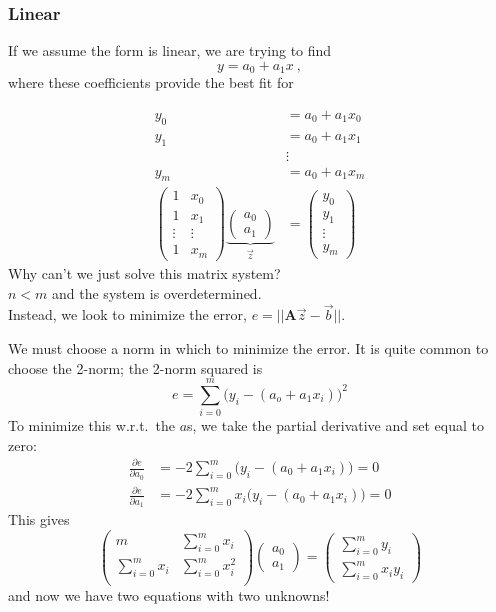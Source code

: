 \documentclass[12pt]{article}
\newcommand{\ve}[1]{\ensuremath{\mathbf{#1}}}
\begin{document}
\subsubsection*{Linear}
If we assume the form is linear, we are trying to find
\[y = a_0 + a_1 x \:,\]
where these coefficients provide the best fit for
 
\begin{align}
y_0 &= a_0 + a_1 x_0 \nonumber \\
y_1 &= a_0 + a_1 x_1 \nonumber\\
& \vdots \nonumber\\
y_m &= a_0 + a_1 x_m \nonumber\\
%
\begin{pmatrix}
1 & x_0 \\ 1 & x_1 \\ \vdots & \vdots \\ 1 & x_m
\end{pmatrix}
\underbrace{\begin{pmatrix}
a_0 \\ a_1
\end{pmatrix}}_{\vec{z}} &=
\begin{pmatrix}
y_0 \\ y_1 \\ \vdots \\ y_m
\end{pmatrix}\nonumber
\end{align}
%
Why can't we just solve this matrix system?\\ $n < m$ and the system is overdetermined.\\ Instead, we look to minimize the error, $e = ||\ve{A}\vec{z} - \vec{b}||$.

We must choose a norm in which to minimize the error. It is quite common to choose the 2-norm; the 2-norm squared is
\[e = \sum_{i=0}^m \bigl(y_i - (a_o + a_1 x_i)\bigr)^2\]
%
To minimize this w.r.t.\ the $a$s, we take the partial derivative and set equal to zero:
%
\begin{align}
\frac{\partial e}{\partial a_0} &= -2 \sum_{i=0}^m \bigl(y_i - (a_0 + a_1 x_i)\bigr) = 0 \nonumber\\
%
\frac{\partial e}{\partial a_1} &= -2 \sum_{i=0}^m x_i \bigl(y_i - (a_0 + a_1 x_i)\bigr) = 0 \nonumber
\end{align}
%
This gives
%
\begin{equation}
\begin{pmatrix}
m                & \sum_{i=0}^m x_i \nonumber\\
\sum_{i=0}^m x_i & \sum_{i=0}^m x_i^2 \nonumber\\ 
\end{pmatrix}
\begin{pmatrix}
a_0 \\ a_1
\end{pmatrix} =
\begin{pmatrix}
\sum_{i=0}^m y_i \\ \sum_{i=0}^m x_i y_i
\end{pmatrix}\nonumber
\end{equation}
%
and now we have two equations with two unknowns! 
\end{document}
